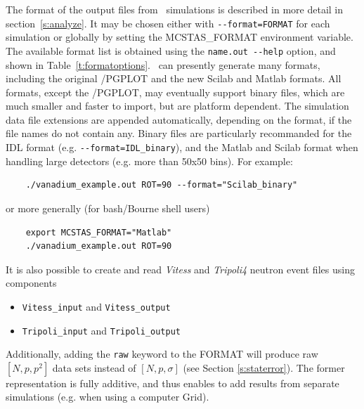 The format of the output files from \MCS\ simulations is described in
more detail in section~\ref{s:analyze}. It may be chosen either with \verb+--format=FORMAT+ for each simulation or globally by setting the MCSTAS\_FORMAT environment variable. 
The available format list is obtained using the \verb+name.out --help+ option, and shown in Table~\ref{t:formatoptions}.      
\MCS\ can presently generate many formats, including the original \MCS /PGPLOT and the new Scilab and Matlab formats. All formats, except the \MCS /PGPLOT, may eventually support binary files, which are much smaller and faster to import, but are platform dependent. The simulation data file extensions are appended automatically, depending on the format, if the file names do not contain any. Binary files are particularly recommanded for the IDL format (e.g. \verb+--format=IDL_binary+), and the Matlab and Scilab format when handling large detectors (e.g. more than 50x50 bins). For example:
\begin{verbatim}
    ./vanadium_example.out ROT=90 --format="Scilab_binary"
\end{verbatim}
or more generally (for bash/Bourne shell users)
\begin{verbatim}
    export MCSTAS_FORMAT="Matlab"
    ./vanadium_example.out ROT=90
\end{verbatim}

It is also possible to create and read \textit{Vitess} and \textit{Tripoli4}
neutron event files using components
\begin{itemize}
\item \verb+Vitess_input+ and \verb+Vitess_output+
\item \verb+Tripoli_input+ and \verb+Tripoli_output+
\end{itemize} 

Additionally, adding the \texttt{raw} keyword to the FORMAT will produce raw $[N, p, p^2]$ data sets instead of $[N, p, \sigma]$ (see Section \ref{s:staterror}). The former representation is fully additive, and thus enables to add results from separate simulations (e.g. when using a computer Grid).

